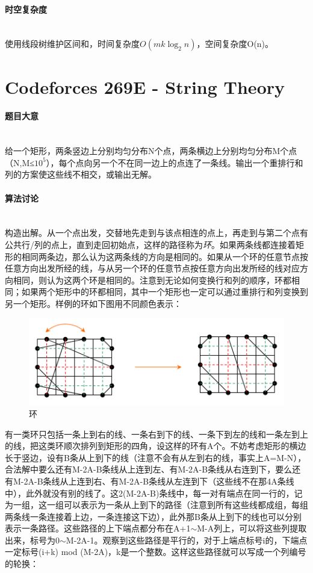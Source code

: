 \documentclass[UTF8]{ctexart}
\newcommand{\myparagraph}[1]{\paragraph{#1}\mbox{}\\}
\theoremstyle{nonumberplain}
\begin{document}
		\myparagraph{时空复杂度}
			
			使用线段树维护区间和，时间复杂度$O(mk\log_2{n})$，空间复杂度O(n)。
	
	\section{Codeforces 269E - String Theory}
	
		\myparagraph{题目大意}
			
			给一个矩形，两条竖边上分别均匀分布N个点，两条横边上分别均匀分布M个点（N,M≤$10^5$），每个点向另一个不在同一边上的点连了一条线。输出一个重排行和列的方案使这些线不相交，或输出无解。
			
		\myparagraph{算法讨论}
		
			构造出解。从一个点出发，交替地先走到与该点相连的点上，再走到与第二个点有公共行/列的点上，直到走回初始点，这样的路径称为\emph{环}。如果两条线都连接着矩形的相同两条边，那么认为这两条线的方向是相同的。如果从一个环的任意节点按任意方向出发所经的线，与从另一个环的任意节点按任意方向出发所经的线对应方向相同，则认为这两个环是相同的。注意到无论如何变换行和列的顺序，环都相同；如果两个矩形中的环都相同，其中一个矩形也一定可以通过重排行和列变换到另一个矩形。样例的环如下图用不同颜色表示：
			
			\begin{figure}[ht]
				\centering
				\includegraphics[width=\textwidth]{fig269e_1.jpg}
				\caption{环}
			\end{figure}
			
			有一类环只包括一条上到右的线、一条右到下的线、一条下到左的线和一条左到上的线，把这类环顺次排列到矩形的四角，设这样的环有A个。不妨考虑矩形的横边长于竖边，设有B条从上到下的线（注意不会有从左到右的线，事实上A=M-N），合法解中要么还有M-2A-B条线从上连到左、有M-2A-B条线从右连到下，要么还有M-2A-B条线从上连到右、有M-2A-B条线从左连到下（这些线不在那4A条线中），此外就没有别的线了。这2(M-2A-B)条线中，每一对有端点在同一行的，记为一组，这一组可以表示为一条从上到下的路径（注意到所有这些线都成组，每组两条线一条连接着上边，一条连接这下边），此外那B条从上到下的线也可以分别表示一条路径。这些路径的上下端点都分布在A+1$\sim$M-A列上，可以将这些列提取出来，标号为0$\sim$M-2A-1。观察到这些路径是平行的，对于上端点标号i的，下端点一定标号(i+k) mod (M-2A)，k是一个整数。这样这些路径就可以写成一个列编号的轮换：
			
\end{document}
